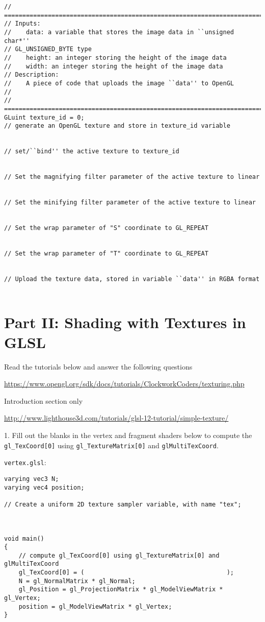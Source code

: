 \documentclass[12pt]{article}
\begin{document}
\begin{lstlisting}
// =======================================================================
// Inputs: 
//    data: a variable that stores the image data in ``unsigned char*''
// GL_UNSIGNED_BYTE type
//    height: an integer storing the height of the image data        
//    width: an integer storing the height of the image data
// Description: 
//    A piece of code that uploads the image ``data'' to OpenGL
//
// =======================================================================
GLuint texture_id = 0;
// generate an OpenGL texture and store in texture_id variable


// set/``bind'' the active texture to texture_id


// Set the magnifying filter parameter of the active texture to linear 


// Set the minifying filter parameter of the active texture to linear 


// Set the wrap parameter of "S" coordinate to GL_REPEAT


// Set the wrap parameter of "T" coordinate to GL_REPEAT


// Upload the texture data, stored in variable ``data'' in RGBA format 


\end{lstlisting}

\pagebreak

\section*{Part II: Shading with Textures in GLSL}

Read the tutorials below and answer the following questions

\href{https://www.opengl.org/sdk/docs/tutorials/ClockworkCoders/texturing.php}{https://www.opengl.org/sdk/docs/tutorials/ClockworkCoders/texturing.php}

Introduction section only

\href{http://www.lighthouse3d.com/tutorials/glsl-12-tutorial/simple-texture/}{http://www.lighthouse3d.com/tutorials/glsl-12-tutorial/simple-texture/}

1. Fill out the blanks in the vertex and fragment shaders below to compute the
\texttt{gl\_TexCoord[0]} using \texttt{gl\_TextureMatrix[0]} and
\texttt{glMultiTexCoord}.

\texttt{vertex.glsl}:


\begin{lstlisting}
varying vec3 N;
varying vec4 position;

// Create a uniform 2D texture sampler variable, with name "tex";



void main()
{
    // compute gl_TexCoord[0] using gl_TextureMatrix[0] and glMultiTexCoord
    gl_TexCoord[0] = (                                       );
    N = gl_NormalMatrix * gl_Normal;
    gl_Position = gl_ProjectionMatrix * gl_ModelViewMatrix * gl_Vertex;
    position = gl_ModelViewMatrix * gl_Vertex;
}
\end{lstlisting}
\end{document}
